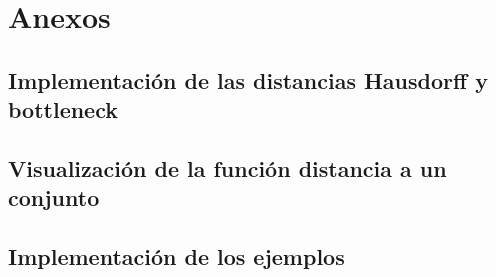 \chapter*{Anexos}

\section{Implementación de las distancias Hausdorff y bottleneck}


\section{Visualización de la función distancia a un conjunto}


\section{Implementación de los ejemplos}






 